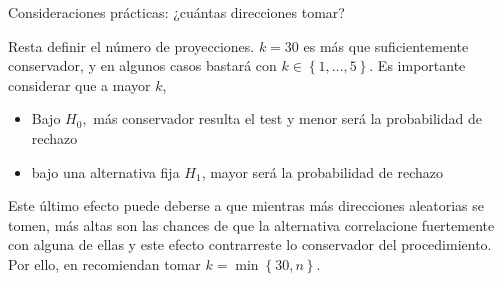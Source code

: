 \documentclass[10pt,spanish,handout]{beamer}\usepackage[]{graphicx}\usepackage[]{color}
\begin{document}
%
\begin{frame}{Consideraciones prácticas: ¿cuántas direcciones tomar?}

Resta definir el número de proyecciones. $k=30$ es más que suficientemente
conservador, y en algunos casos bastará con $k\in\left\{ 1,\dots,5\right\} $.
Es importante considerar que a mayor $k$,

\pause{}
\begin{itemize}
\item Bajo $H_{0},$ más conservador resulta el test y menor será la probabilidad
de rechazo
\end{itemize}

\pause{}
\begin{itemize}
\item bajo una alternativa fija $H_{1}$, mayor será la probabilidad de
rechazo
\end{itemize}

\pause{}

Este último efecto puede deberse a que mientras más direcciones aleatorias
se tomen, más altas son las chances de que la alternativa correlacione
fuertemente con alguna de ellas y este efecto contrarreste lo conservador
del procedimiento. Por ello, en \cite{Cuesta 2010} recomiendan tomar
$k=\min\left\{ 30,n\right\} .$
\end{frame}
\end{document}
